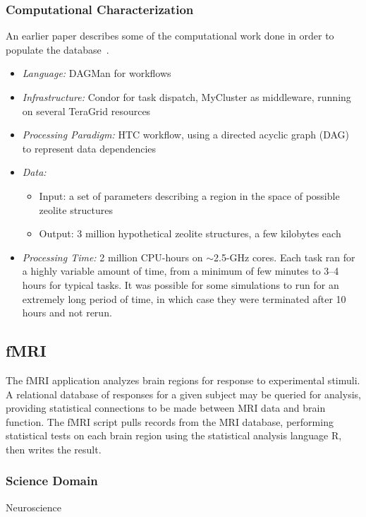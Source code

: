 \documentclass[10pt,letterpaper]{article}
\begin{document}
\subsubsection{Computational Characterization}
An earlier paper describes some of the computational work done
in order to populate the database~\cite{walker-07}.
\begin {itemize}
\item {\em Language:} DAGMan for workflows
\item {\em Infrastructure:} Condor for task dispatch, MyCluster as middleware, running on
                        several TeraGrid resources
\item {\em Processing Paradigm:} HTC workflow, using a directed acyclic graph (DAG) to represent data dependencies
\item {\em Data:} \begin{itemize}
    \item Input: a set of parameters describing a region in the space of possible 
    zeolite structures
    \item Output: 3 million hypothetical zeolite structures, a few kilobytes each
    \end{itemize}
\item {\em Processing Time:} 2 million CPU-hours on $\sim$2.5-GHz cores.  Each task ran for a highly variable
            amount of time, from a minimum of few minutes to 3--4 hours for typical tasks.  It was possible for some simulations to run for an extremely long period of time, in which case they were terminated after 10 hours and not rerun.
\end {itemize}


\subsection{fMRI}

The fMRI application analyzes brain regions for response to experimental stimuli. A relational database of responses for a given subject may be queried for analysis, providing statistical connections to be made between MRI data and brain function. The fMRI script pulls records from the MRI database, performing statistical tests on each brain region using the statistical analysis language R, then writes the result.

\subsubsection{Science Domain} Neuroscience
\end{document}

